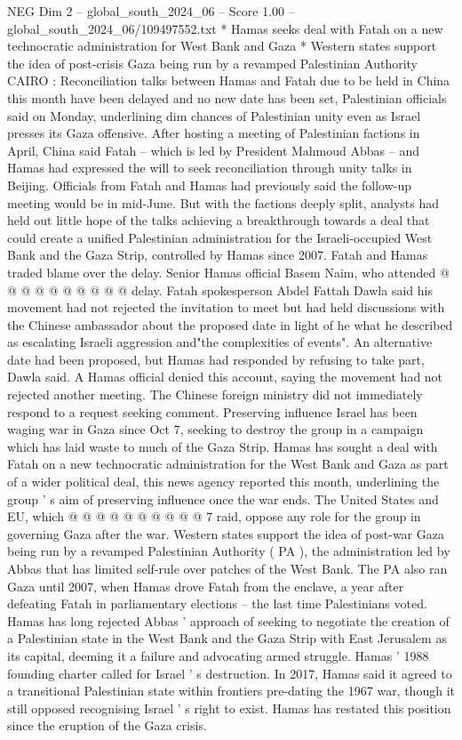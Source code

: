 \begin{textsample}{NEG Dim 2 – global\_south\_2024\_06 – Score 1.00 – global\_south\_2024\_06/109497552.txt}  \label{ex:f2_neg_390}
* Hamas seeks deal with Fatah on a new technocratic administration for West Bank and Gaza * Western states support the idea of post-crisis Gaza being run by a revamped Palestinian Authority CAIRO : Reconciliation talks between Hamas and Fatah due to be held in China this month have been delayed and no new date has been set, Palestinian officials said on Monday, underlining dim chances of Palestinian unity even as Israel presses its Gaza offensive.
After hosting a meeting of Palestinian factions in April, China said Fatah -- which is led by President Mahmoud Abbas -- and Hamas had expressed the will to seek reconciliation through unity talks in Beijing.
Officials from Fatah and Hamas had previously said the follow-up meeting would be in mid-June.
But with the factions deeply split, analysts had held out little hope of the talks achieving a breakthrough towards a deal that could create a unified Palestinian administration for the Israeli-occupied West Bank and the Gaza Strip, controlled by Hamas since 2007.
Fatah and Hamas traded blame over the delay.
Senior Hamas official Basem Naim, who attended @ @ @ @ @ @ @ @ @ @ delay.
Fatah spokesperson Abdel Fattah Dawla said his movement had not rejected the invitation to meet but had held discussions with the Chinese ambassador about the proposed date in light of he what he described as escalating Israeli aggression and"the complexities of events".
An alternative date had been proposed, but Hamas had responded by refusing to take part, Dawla said.
A Hamas official denied this account, saying the movement had not rejected another meeting.
The Chinese foreign ministry did not immediately respond to a request seeking comment.
Preserving influence Israel has been waging war in Gaza since Oct 7, seeking to destroy the group in a campaign which has laid waste to much of the Gaza Strip.
Hamas has sought a deal with Fatah on a new technocratic administration for the West Bank and Gaza as part of a wider political deal, this news agency reported this month, underlining the group ' s aim of preserving influence once the war ends.
The United States and EU, which @ @ @ @ @ @ @ @ @ @ 7 raid, oppose any role for the group in governing Gaza after the war.
Western states support the idea of post-war Gaza being run by a revamped Palestinian Authority ( PA ), the administration led by Abbas that has limited self-rule over patches of the West Bank.
The PA also ran Gaza until 2007, when Hamas drove Fatah from the enclave, a year after defeating Fatah in parliamentary elections -- the last time Palestinians voted.
Hamas has long rejected Abbas ' approach of seeking to negotiate the creation of a Palestinian state in the West Bank and the Gaza Strip with East Jerusalem as its capital, deeming it a failure and advocating armed struggle.
Hamas ' 1988 founding charter called for Israel ' s destruction.
In 2017, Hamas said it agreed to a transitional Palestinian state within frontiers pre-dating the 1967 war, though it still opposed recognising Israel ' s right to exist.
Hamas has restated this position since the eruption of the Gaza crisis.

\end{textsample}

